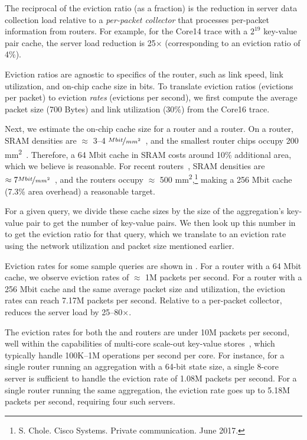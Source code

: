 The reciprocal of the eviction ratio (as a fraction) is the reduction in server
data collection load relative to a {\em per-packet collector} that processes
per-packet information from routers. For example, for the Core14 trace with a
$2^{19}$ key-value pair cache, the server load reduction is 25$\times$
(corresponding to an eviction ratio of 4\%).

Eviction ratios are agnostic to specifics of the router, such as link speed,
link utilization, and on-chip cache size in bits. To translate
eviction ratios (evictions per packet) to eviction \emph{rates} (evictions per
second), we first compute the average packet size (700 Bytes) and link utilization
(30\%) from the Core16 trace.

Next, we estimate the on-chip cache size for a \tengrouter router and a
\hundredgrouter router.
On a \tengrouter router, SRAM
densities are $\approx$ 3--4 $\nicefrac{Mbit}{mm^2}$~\cite{sram_45nm_wiki}, and
the smallest router chips occupy 200
\si{\milli\metre\squared}~\cite{gibb_parsing}.  Therefore, a 64 Mbit cache in
SRAM costs around 10\% additional area, which we believe is reasonable.
For recent \hundredgrouter routers~\cite{tomahawk2},
 SRAM densities are $\approx7
\nicefrac{Mbit}{mm^2}$~\cite{sram_estimate}, and the routers occupy
$\approx$ 500 \si{\milli\metre\squared},\footnote{S. Chole. Cisco Systems. Private
communication.  June 2017.} making a 256 Mbit cache (7.3\% area
overhead) a reasonable target.

For a given query, we divide these cache sizes by the size of
the aggregation's key-value pair to get
the number of key-value pairs. We then look up this number in 
to get the eviction ratio for that query, which we translate to an eviction rate
using the network utilization and packet size mentioned earlier.

Eviction rates for some sample queries are shown in .
 For a \tengrouter router with a 64 Mbit cache, we observe eviction rates of
$\approx$ 1M packets per second.  For a \hundredgrouter router with a 256 Mbit
cache and the same average packet size and utilization, the eviction rates can
reach
 7.17M packets per second. Relative to a per-packet collector,
\TheSystem reduces the server load by 25--80$\times$.

The eviction rates for both the \tenglink and \hundredglink routers are
under 10M packets per second, well within the capabilities of multi-core
scale-out key-value
stores~\cite{redis_benchmark, memcached_benchmark, redis_vs_memcached_update},
which typically handle 100K--1M operations per second per core.  For instance,
for a single \tengrouter router running an aggregation with a 64-bit
state size, a single 8-core server is sufficient to handle the eviction rate of
1.08M packets per second. For a single \hundredgrouter router running
the same aggregation, the eviction rate goes up to 5.18M packets per
second, requiring four such servers.

